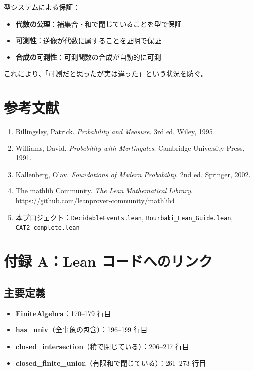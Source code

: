 \documentclass[12pt,a4paper,ja=standard]{bxjsarticle}
\theoremstyle{definition}
\begin{document}
\begin{insight}
型システムによる保証：

\begin{itemize}
    \item \textbf{代数の公理}：補集合・和で閉じていることを型で保証
    \item \textbf{可測性}：逆像が代数に属することを証明で保証
    \item \textbf{合成の可測性}：可測関数の合成が自動的に可測
\end{itemize}

これにより、「可測だと思ったが実は違った」という状況を防ぐ。
\end{insight}

\section*{参考文献}

\begin{enumerate}
    \item Billingsley, Patrick. \textit{Probability and Measure}. 3rd ed. Wiley, 1995.
    \item Williams, David. \textit{Probability with Martingales}. Cambridge University Press, 1991.
    \item Kallenberg, Olav. \textit{Foundations of Modern Probability}. 2nd ed. Springer, 2002.
    \item The mathlib Community. \textit{The Lean Mathematical Library}. \url{https://github.com/leanprover-community/mathlib4}
    \item 本プロジェクト：\texttt{DecidableEvents.lean}, \texttt{Bourbaki\_Lean\_Guide.lean}, \texttt{CAT2\_complete.lean}
\end{enumerate}

\section*{付録 A：Lean コードへのリンク}

\subsection*{主要定義}

\begin{itemize}
    \item \textbf{FiniteAlgebra}：170--179 行目
    \item \textbf{has\_univ}（全事象の包含）：196--199 行目
    \item \textbf{closed\_intersection}（積で閉じている）：206--217 行目
    \item \textbf{closed\_finite\_union}（有限和で閉じている）：261--273 行目
\end{itemize}
\end{document}
